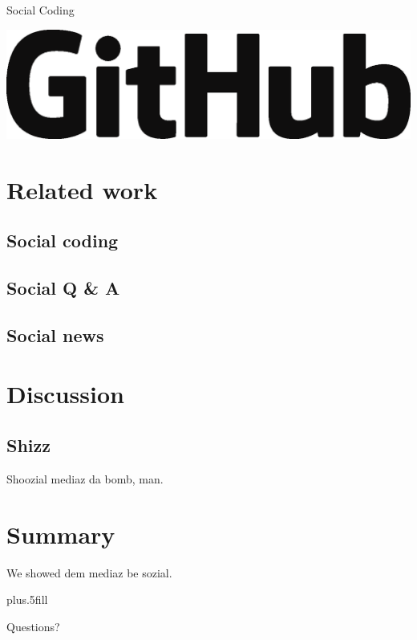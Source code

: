 \documentclass{beamer}
\begin{document}
\begin{frame}{Social Coding}
  \begin{center}
    \includegraphics[width=.6\textwidth]{GitHub_Logo.eps}
  \end{center}
\end{frame}

\section{Related work}

\subsection{Social coding}


\subsection{Social Q \&{} A}

\subsection{Social news}


\section{Discussion}

\subsection{Shizz}

\begin{frame}
  Shoozial mediaz da bomb, man.
\end{frame}

\section*{Summary}

\begin{frame}
  We showed dem mediaz be sozial.

  
  \pause
  \vskip0pt plus.5fill

  Questions?
\end{frame}
\end{document}

